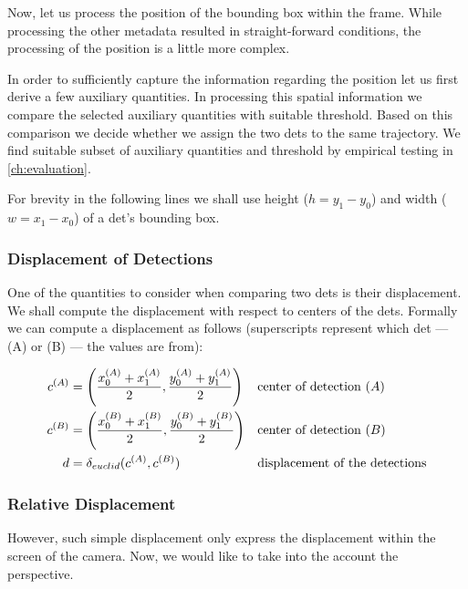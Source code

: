 \label{ssec:spatial_merging}

Now, let us process the position of the bounding box within the frame. While processing the other metadata resulted in straight-forward conditions, the processing of the position is a little more complex.

In order to sufficiently capture the information regarding the position let us first derive a few auxiliary quantities. In processing this spatial information we compare the selected auxiliary quantities with suitable threshold. Based on this comparison we decide whether we assign the two \glspl{det} to the same trajectory. We find suitable subset of auxiliary quantities and threshold by empirical testing in \autoref{ch:evaluation}.

For brevity in the following lines we shall use height ($h = y_1 - y_0$) and
width ($w = x_1 - x_0$) of a \gls{det}'s bounding box.

\subsubsection{Displacement of Detections}

One of the quantities to consider when comparing two \glspl{det} is
their displacement. We shall compute the displacement with respect to centers
of the \glspl{det}. Formally we can compute a displacement as follows
(superscripts represent which \gls{det} --- (A) or (B) --- the values are from):

\begin{align*}
    c^{(A)} &= \left(\frac{x_0^{(A)} + x_1^{(A)}}{2}, \frac{y_0^{(A)} + y_1^{(A)}}{2}\right) &\vspace{1cm}&\text{center of detection }(A)\\
    c^{(B)} &= \left(\frac{x_0^{(B)} + x_1^{(B)}}{2}, \frac{y_0^{(B)} + y_1^{(B)}}{2}\right) &\vspace{1cm}&\text{center of detection }(B)\\
    d &= \delta_{euclid}(c^{(A)}, c^{(B)})&\vspace{1cm}&\text{displacement of the detections}
\end{align*}

\subsubsection{Relative Displacement}

However, such simple displacement only express the displacement within the screen of the camera. Now, we would like to take into the account the perspective.


